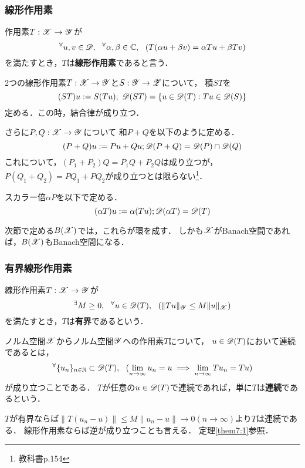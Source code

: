     \subsubsection{線形作用素}
    \begin{Def}
        作用素$T:\mathscr{X} \to \mathscr{Y}$が
        \[ {}^{\forall}  u,v \in \mathscr{D},~~ {}^{\forall} \alpha, \beta \in \mathbb{C},~~ (T(\alpha u+\beta v)=\alpha Tu+\beta Tv) \]
        を満たすとき，$T$は\textbf{線形作用素}であると言う．
    \end{Def}

    \begin{Def}
        2つの線形作用素$T:\mathscr{X} \to \mathscr{Y}$と$S:\mathscr{Y} \to \mathscr{Z}$について，
        積$ST$を
        \[ (ST)u:=S(Tu);~ \mathscr{D}(ST)=\{ u \in \mathscr{D}(T) : Tu \in \mathscr{D}(S) \} \]
        定める．この時，結合律が成り立つ．

        さらに$P, Q:\mathscr{X} \to \mathscr{Y}$について
        和$P+Q$を以下のように定める．
        \[ (P+Q)u:=Pu+Qu; \mathscr{D}(P+Q)=\mathscr{D}(P) \cap \mathscr{D}(Q)  \]
        これについて，$(P_1+P_2)Q=P_1 Q+P_2 Q$は成り立つが，
        $P(Q_1+Q_2)=P Q_1+P Q_2$が成り立つとは限らない\footnote{教科書p.154}．

        スカラー倍$\alpha P$を以下で定める．
        \[ (\alpha T)u:=\alpha (Tu); \mathscr{D}(\alpha T)=\mathscr{D}(T) \]
    \end{Def}
    次節で定める$B(\mathscr{X})$では，これらが環を成す．
    しかも$\mathscr{X}$がBanach空間であれば，$B(\mathscr{X})$もBanach空間になる．

    \subsubsection{有界線形作用素}
    \begin{Def}
        線形作用素$T:\mathscr{X} \to \mathscr{Y}$が
        \[ {}^{\exists} M \geq 0,~~ {}^{\forall} u \in \mathscr{D}(T),~~ (\|Tu\|_{\mathscr{Y}} \leq M \|u\|_{\mathscr{X}}) \]
        を満たすとき，$T$は\textbf{有界}であるという．
    \end{Def}

    \begin{Def}
        ノルム空間$\mathscr{X}$からノルム空間$\mathscr{Y}$への作用素$T$について，
        $u \in \mathscr{D}(T)$において連続であるとは，
        \[ {}^{\forall} \{ u_n\}_{n \in \mathbb{N}} \subset \mathscr{D}(T),~~ (\lim_{n \to \infty}u_n=u \implies \lim_{n \to \infty}T u_n=Tu)  \]
        が成り立つことである．
        $T$が任意の$u \in \mathscr{D}(T)$で連続であれば，単に$T$は\textbf{連続}であるという．
    \end{Def}
    $T$が有界ならば$\|T(u_n-u)\| \leq M\|u_n-u\| \to 0(n \to \infty)$より$T$は連続である．
    線形作用素ならば逆が成り立つことも言える．
    定理\ref{them7:1}参照．

